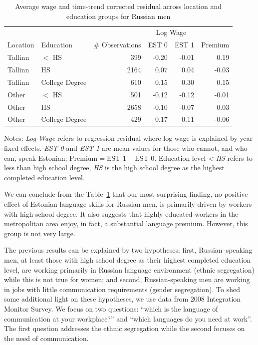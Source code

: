 \documentclass[12pt, a4paper]{article}
\begin{document}
\begin{table}[ht]
  \centering
  \caption{Average wage and time-trend corrected residual across
    location and education groups for Russian men}
  \begin{tabular}{llrrrr}
    \toprule
    & & &\multicolumn{2}{c}{Log Wage}\\
    Location & Education & \# Observations & EST 0 & EST 1 & Premium\\
    \midrule
    Tallinn & $<$ HS & 399 & -0.20 & -0.01 & 0.19 \\ 
    Tallinn & HS & 2164 & 0.07 & 0.04 & -0.03 \\ 
    Tallinn & College Degree & 610 & 0.15 & 0.30 & 0.15 \\ 
    Other & $<$ HS & 501 & -0.12 & -0.12 & -0.01 \\ 
    Other & HS & 2658 & -0.10 & -0.07 & 0.03 \\ 
    Other & College Degree & 429 & 0.17 & 0.11 & -0.06 \\ 
    \bottomrule
  \end{tabular}
  \begin{flushleft}
    Notes: \emph{Log Wage} refers to regression residual where log
    wage is explained by year fixed effects.  \emph{EST 0} and
    \emph{EST 1} are mean values for those who cannot, and who can,
    speak Estonian; $\text{Premium} = \text{EST 1} - \text{EST 0}$.
    Education level \emph{< HS} refers to less than high school
    degree, \emph{HS} is the high school degree as the highest
    completed education level.
  \end{flushleft}
  \label{tab:loc-lang-edu}
\end{table}

We can conclude from the Table~\ref{tab:loc-lang-edu} that our
most surprising finding, no positive effect of Estonian language
skills for Russian men, is primarily driven by workers with
high school degree.  It also suggests that highly educated workers in
the metropolitan area enjoy, in fact, a substantial language premium.
However, this group is not very large.

The previous results can be explained by two hypotheses: first,
Russian--speaking men, at least those with high school degree as their
highest completed education level, are working
primarily in Russian language environment (ethnic segregation) while this is not true for
women; and second, Russian-speaking men are working in jobs with
little communication requirements (gender segregation).
To shed some additional light on these hypotheses, we use data
from 2008 Integration Monitor Survey.  We focus on
two questions: ``which is the language of communication at your
workplace?'' and ``which languages do you need at work''.  The first
question addresses the ethnic segregation while the second focuses on
the need of communication.  
\end{document}
